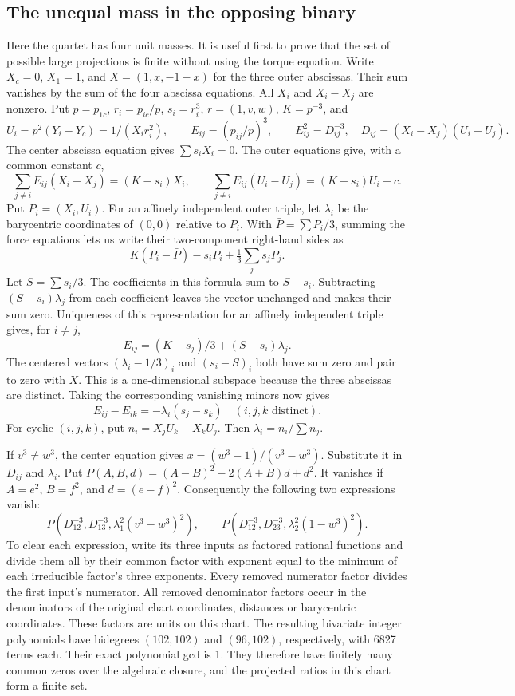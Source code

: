 \documentclass[11pt,letterpaper]{article}
\theoremstyle{definition}
\begin{document}
\subsection{The unequal mass in the opposing binary}\label{nf:binary}
Here the quartet has four unit masses. It is useful first to prove that the
set of possible large projections is finite without using the torque equation.
Write $X_c=0$, $X_1=1$, and $X=(1,x,-1-x)$ for the three outer abscissas. Their sum vanishes by the sum of the four abscissa equations. All $X_i$ and $X_i-X_j$ are nonzero. Put $p=p_{1c}$, $r_i=p_{ic}/p$, $s_i=r_i^3$, $r=(1,v,w)$, $K=p^{-3}$, and
\[
 U_i=p^2(Y_i-Y_c)=1/(X_i r_i^2),\qquad
 E_{ij}=(p_{ij}/p)^3,\qquad E_{ij}^2=D_{ij}^{-3},\quad
 D_{ij}=(X_i-X_j)(U_i-U_j).
\]
The center abscissa equation gives $\sum s_i X_i=0$. The outer equations give, with a common constant $c$,
\[
 \sum_{j\ne i}E_{ij}(X_i-X_j)=(K-s_i)X_i,\qquad
 \sum_{j\ne i}E_{ij}(U_i-U_j)=(K-s_i)U_i+c.
\]
Put $P_i=(X_i,U_i)$. For an affinely independent outer triple, let $\lambda_i$ be the barycentric coordinates of $(0,0)$ relative to $P_i$. With $\bar P=\sum P_i/3$, summing the force equations lets us write their two-component right-hand sides as
\[
 K(P_i-\bar P)-s_iP_i+\tfrac13\sum_j s_jP_j .
\]
Let $S=\sum s_i/3$. The coefficients in this formula sum to $S-s_i$. Subtracting $(S-s_i)\lambda_j$ from each coefficient leaves the vector unchanged and makes their sum zero. Uniqueness of this representation for an affinely independent triple gives, for $i\ne j$,
\[
 E_{ij}=(K-s_j)/3+(S-s_i)\lambda_j.
\]
The centered vectors $(\lambda_i-1/3)_i$ and $(s_i-S)_i$ both have sum zero and pair to zero with $X$. This is a one-dimensional subspace because the three abscissas are distinct. Taking the corresponding vanishing minors now gives
\[
 E_{ij}-E_{ik}=-\lambda_i(s_j-s_k)\quad (i,j,k\text{ distinct}).
\]
For cyclic $(i,j,k)$, put $n_i=X_jU_k-X_kU_j$. Then $\lambda_i=n_i/\sum n_j$.

If $v^3\ne w^3$, the center equation gives $x=(w^3-1)/(v^3-w^3)$. Substitute it in $D_{ij}$ and $\lambda_i$. Put $P(A,B,d)=(A-B)^2-2(A+B)d+d^2$. It vanishes if $A=e^2$, $B=f^2$, and $d=(e-f)^2$. Consequently the following two expressions vanish:
\[
 P(D_{12}^{-3},D_{13}^{-3},\lambda_1^2(v^3-w^3)^2),\qquad
 P(D_{12}^{-3},D_{23}^{-3},\lambda_2^2(1-w^3)^2).
\]
To clear each expression, write its three inputs as factored rational functions and divide them all by their common factor with exponent equal to the minimum of each irreducible factor's three exponents. Every removed numerator factor divides the first input's numerator. All removed denominator factors occur in the denominators of the original chart coordinates, distances or barycentric coordinates. These factors are units on this chart. The resulting bivariate integer polynomials have bidegrees $(102,102)$ and $(96,102)$, respectively, with 6827 terms each. Their exact polynomial gcd is 1. They therefore have finitely many common zeros over the algebraic closure, and the projected ratios in this chart form a finite set.
\end{document}
